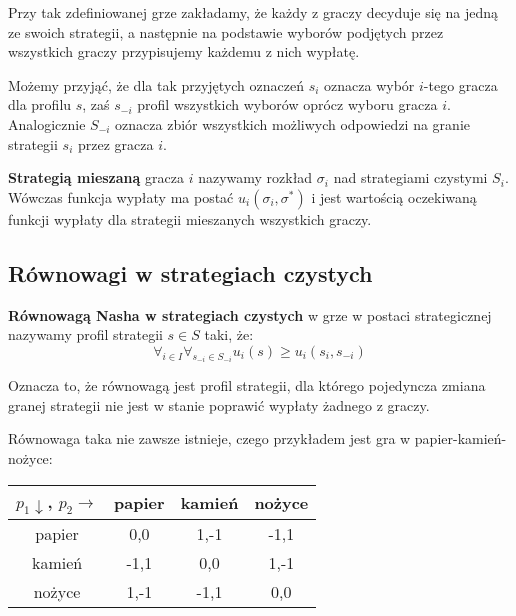 \documentclass[polish]{standalone}
\begin{document}
Przy tak zdefiniowanej grze zakładamy, że każdy z graczy decyduje się na jedną ze swoich strategii, a następnie
na podstawie wyborów podjętych przez wszystkich graczy przypisujemy każdemu z nich wypłatę.

Możemy przyjąć, że dla tak przyjętych oznaczeń $s_i$ oznacza wybór $i$-tego gracza dla profilu $s$, zaś $s_{-i}$ profil
wszystkich wyborów oprócz wyboru gracza $i$. Analogicznie $S_{-i}$ oznacza zbiór wszystkich możliwych odpowiedzi
na granie strategii $s_i$ przez gracza $i$.

\begin{definition}
\textbf{Strategią mieszaną} gracza $i$ nazywamy rozkład $\sigma_i$ nad strategiami czystymi $S_i$. Wówczas funkcja
wypłaty ma postać $u_i(\sigma_i, \sigma^{*})$ i jest wartością oczekiwaną funkcji wypłaty dla strategii mieszanych
wszystkich graczy.
\cite[str.~5]{FT-GT}
\end{definition}

\subsection{Równowagi w strategiach czystych}

\begin{definition}
\textbf{Równowagą Nasha w strategiach czystych} w grze w postaci strategicznej nazywamy profil strategii $s \in S$ taki,
że:
$$\forall_{i \in I} \forall_{s_{-i} \in S_{-i}} u_i(s) \geq u_i(s_i, s_{-i})$$
\cite[str.~11]{FT-GT}
\end{definition}

Oznacza to, że równowagą jest profil strategii, dla którego pojedyncza zmiana granej strategii nie jest w stanie 
poprawić wypłaty żadnego z graczy.

Równowaga taka nie zawsze istnieje, czego przykładem jest gra w papier-kamień-nożyce:
\begin{center}
\begin{tabular}[t]{| c | c | c | c |}
\hline
$p_1 \downarrow$, $p_2 \rightarrow$  & papier & kamień & nożyce \\
\hline
papier                               & 0,0    & 1,-1   & -1,1   \\
\hline
kamień                               & -1,1   & 0,0    & 1,-1   \\
\hline
nożyce                               & 1,-1   & -1,1   & 0,0    \\
\hline
\end{tabular}
\end{center}
\end{document}
